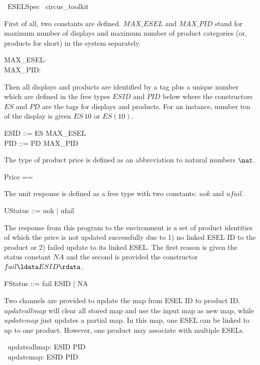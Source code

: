 \begin{zsection}
	\SECTION\ ESELSpec \parents\ circus\_toolkit
\end{zsection}

First of all, two constants are defined. $MAX\_ESEL$ and $MAX\_PID$ stand for maximum number of displays and maximum number of product categories (or, products for short) in the system separately.
\begin{axdef}
    MAX\_ESEL: \nat \\
    MAX\_PID: \nat
\end{axdef}

Then all displays and products are identified by a tag plus a unique number which are defined in the free types $ESID$ and $PID$ below where the constructors $ES$ and $PD$ are the tags for displays and products. For an instance, number ten of the display is given $ES~10$ or $ES(10)$.
\begin{zed}
    ESID ::= ES  \upto MAX\_ESEL \rdata \\
    PID ::= PD  \upto MAX\_PID \rdata
\end{zed}

The type of product price is defined as an abbreviation to natural numbers $\nat$.
\begin{zed}
    Price == \nat
\end{zed}

The unit response is defined as a free type with two constants: $uok$ and $ufail$.
\begin{zed}
    UStatus ::= uok | ufail
\end{zed}

The response from this program to the environment is a set of product identities of which the price is not updated successfully due to 1) no linked ESEL ID to the product or 2) failed update to its linked ESEL. The first reason is given the status constant $NA$ and the second is provided the constructor $fail\ldata ESID \rdata$.
\begin{zed}
    FStatus ::= fail \ldata ESID \rdata | NA 
\end{zed}

Two channels are provided to update the map from ESEL ID to product ID. $updateallmap$ will clear all stored map and use the input map as new map, while $updatemap$ just updates a partial map. In this map, one ESEL can be linked to up to one product. However, one product may associate with multiple ESELs. 
\begin{circus}
	\circchannel\ updateallmap: ESID \pfun PID \\
	\circchannel\ updatemap: ESID \pfun PID
\end{circus}

